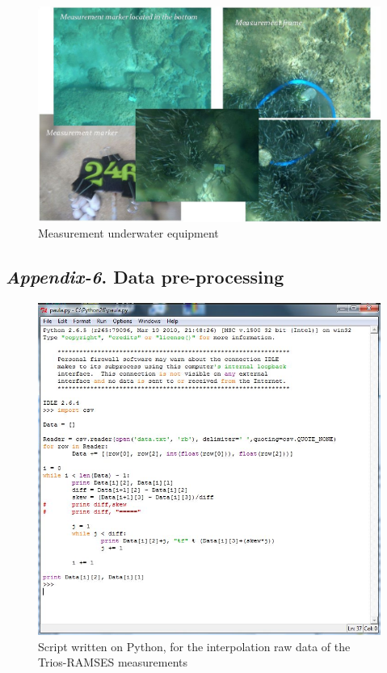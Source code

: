 \documentclass[11pt]{article}
\begin{document}
\begin{appendices}
\begin{figure}[h]
	\begin{center}
		\includegraphics[scale=0.35]{Fig-3-16.jpg}
		\caption{Measurement underwater equipment}\label{fig:A.7}		
	\end{center}
\end{figure}
\pagebreak

\subsection{\textit{Appendix-6}. Data pre-processing}

\begin{figure}[H]
	\centering
	\includegraphics[scale=0.55]{Fig-24.jpg}
	\caption{Script written on Python, for the interpolation raw data of the Trios-RAMSES measurements}
	\label{fig:A.8}
\end{figure}
\pagebreak


\end{appendices}
\end{document}
